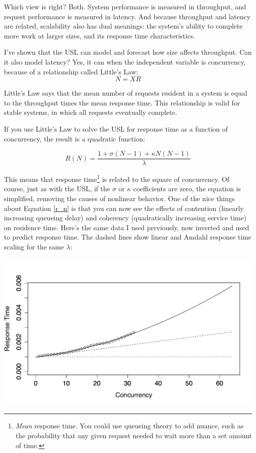 \documentclass{vivid_layout}
\begin{document}
Which view is right? Both. System performance is measured in throughput, and
request performance is measured in latency. And because throughput and latency
are related, scalability also has dual meanings: the system's ability to
complete more work at larger sizes, and its response time characteristics.

I've shown that the USL can model and forecast how size affects throughput. Can
it also model latency? Yes, it can when the independent variable is concurrency,
because of a relationship called Little's Law:
\begin{equation}
N = X R
\label{littles_law}
\end{equation}

Little's Law says that the mean number of requests resident in a system is
equal to the throughput times the mean response time. This relationship is
valid for stable systems, in which all requests eventually complete.

If you use Little's Law to solve the USL for response time as a function of
concurrency, the result is a quadratic function:

\begin{equation}
R(N)=\frac{1+\sigma(N-1)+\kappa N(N-1)}{\lambda}
\label{r_n}
\end{equation}

This means that response time\footnote{{\itshape Mean} response time. You could
use queueing theory to add nuance, such as the probability that any given
request needed to wait more than a set amount of time.} is related to the square
of concurrency.  Of course, just as with the USL, if the $\sigma$ or $\kappa$
coefficients are zero, the equation is simplified, removing the causes of
nonlinear behavior. One of the nice things about Equation \ref{r_n} is that you
can now see the effects of contention (linearly increasing queueing delay) and
coherency (quadratically increasing service time) on residence time.  Here's the
same data I used previously, now inverted and used to predict response time. The
dashed lines show linear and Amdahl response time scaling for the same
$\lambda$:
\begin{center}
\includegraphics[width=.85\linewidth]{scalability/cisco-tput}
\end{center}
\end{document}
